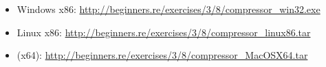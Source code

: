 \begin{itemize}
\item Windows x86: \url{http://beginners.re/exercises/3/8/compressor_win32.exe}
\item Linux x86: \url{http://beginners.re/exercises/3/8/compressor_linux86.tar}
\item \MacOSX (x64): \url{http://beginners.re/exercises/3/8/compressor_MacOSX64.tar}
\end{itemize}


